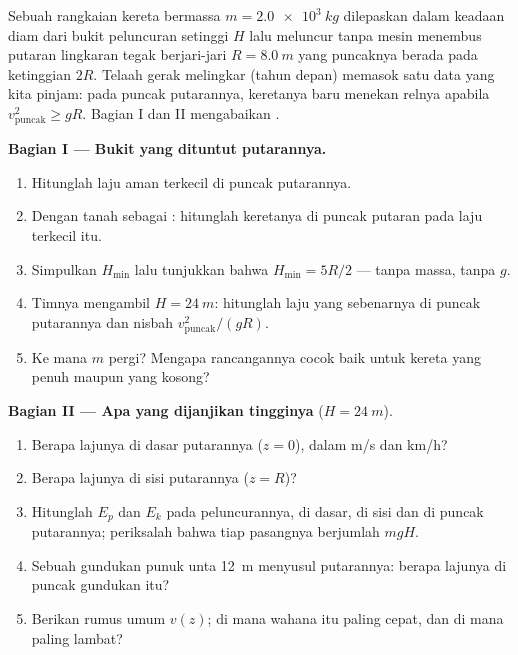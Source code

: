 \begin{problem}
\label{pb:g11:mechanical-energy:1}
Sebuah rangkaian kereta bermassa $m = \qty{2.0e3}{kg}$ dilepaskan dalam
keadaan diam dari bukit peluncuran setinggi $H$ lalu meluncur tanpa
mesin menembus putaran lingkaran tegak berjari-jari $R = \qty{8.0}{m}$
yang puncaknya berada pada ketinggian $2R$. Telaah gerak melingkar
(tahun depan) memasok satu data yang kita pinjam: pada puncak
putarannya, keretanya baru menekan relnya apabila
$v_{\text{puncak}}^2 \geq gR$. Bagian I dan II mengabaikan .

\medskip
\noindent\textbf{Bagian I --- Bukit yang dituntut putarannya.}
\begin{enumerate}
  \item Hitunglah laju aman terkecil di puncak putarannya.
  \item Dengan tanah sebagai : hitunglah 
        keretanya di puncak putaran pada laju terkecil itu.
  \item Simpulkan $H_{\min}$ lalu tunjukkan bahwa $H_{\min} = 5R/2$ ---
        tanpa massa, tanpa $g$.
  \item Timnya mengambil $H = \qty{24}{m}$: hitunglah laju yang
        sebenarnya di puncak putarannya dan nisbah
        $v_{\text{puncak}}^2/(gR)$.
  \item Ke mana $m$ pergi? Mengapa rancangannya cocok baik untuk kereta
        yang penuh maupun yang kosong?
\end{enumerate}

\medskip
\noindent\textbf{Bagian II --- Apa yang dijanjikan tingginya} ($H = \qty{24}{m}$).
\begin{enumerate}[resume]
  \item Berapa lajunya di dasar putarannya ($z = 0$), dalam \unit{m/s}
        dan \unit{km/h}?
  \item Berapa lajunya di sisi putarannya ($z = R$)?
  \item Hitunglah $E_p$ dan $E_k$ pada peluncurannya, di dasar, di sisi
        dan di puncak putarannya; periksalah bahwa tiap pasangnya
        berjumlah $mgH$.
  \item Sebuah gundukan punuk unta \qty{12}{m} menyusul putarannya:
        berapa lajunya di puncak gundukan itu?
  \item Berikan rumus umum $v(z)$; di mana wahana itu paling cepat, dan
        di mana paling lambat?
\end{enumerate}


\end{problem}
